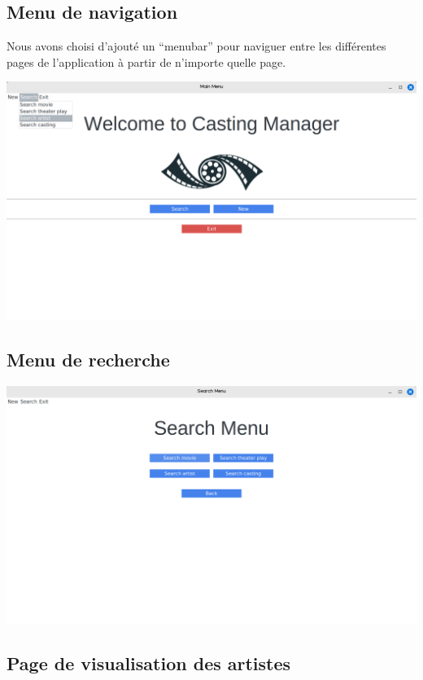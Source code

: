 \documentclass{article}
\begin{document}
\subsection{Menu de navigation}
Nous avons choisi d'ajouté un ``menubar'' pour naviguer entre les
différentes pages de l'application à partir de n'importe quelle page.
\begin{center}
  \includegraphics[scale=0.16]{menubar.png}
\end{center}


\subsection{Menu de recherche}

\begin{center}
  \includegraphics[scale=0.16]{search.png}
\end{center}

\subsection{Page de visualisation des artistes}
\end{document}
